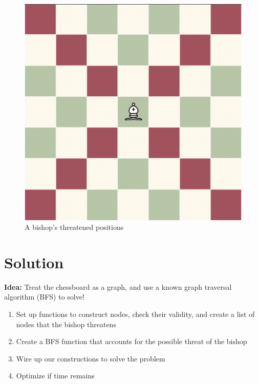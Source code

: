 \documentclass[11pt]{exam}
\begin{document}
\begin{figure}[H]
	\centering
	\includegraphics[width=0.7\linewidth]{images/bishop_moves.png}
    \caption{A bishop's threatened positions}
\end{figure}


\newpage
\section*{Solution}
\textbf{Idea:} Treat the chessboard as a graph, and use a known graph traversal algorithm (BFS) to solve!
\begin{enumerate}
	\item Set up functions to construct nodes, check their validity, and create a list of nodes that the bishop threatens
	\item Create a BFS function that accounts for the possible threat of the bishop
	\item Wire up our constructions to solve the problem
	\item Optimize if time remains
\end{enumerate}
\end{document}
